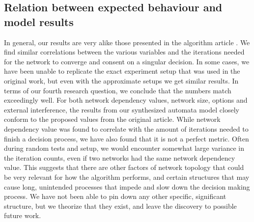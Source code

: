 \subsection{Relation between expected behaviour and model results}
In general, our results are very alike those presented in the algorithm article \parencite{AlgorithmPaper}. We find similar correlations between the various variables and the iterations needed for the network to converge and consent on a singular decision. In some cases, we have been unable to replicate the exact experiment setup that was used in the original work, but even with the approximate setups we get similar results. In terms of our fourth research question, we conclude that the numbers match exceedingly well. For both network dependency values, network size, options and external interference, the results from our synthesized automata model closely conform to the proposed values from the original article.
While network dependency value was found to correlate with the amount of iterations needed to finish a decision process, we have also found that it is not a perfect metric. Often during random tests and setup, we would encounter somewhat large variance in the iteration counts, even if two networks had the same network dependency value. This suggests that there are other factors of network topology that could be very relevant for how the algorithm performs, and certain structures that may cause long, unintended processes that impede and slow down the decision making process. We have not been able to pin down any other specific, significant structure, but we theorize that they exist, and leave the discovery to possible future work.
